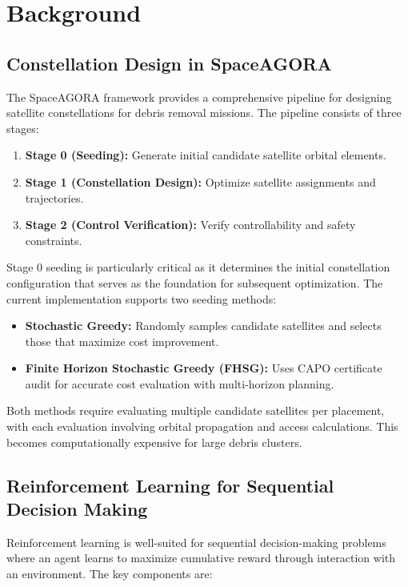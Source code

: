 \section{Background}
\label{sec:background}

\subsection{Constellation Design in SpaceAGORA}

The SpaceAGORA framework provides a comprehensive pipeline for designing satellite constellations for debris removal missions. The pipeline consists of three stages:

\begin{enumerate}
    \item \textbf{Stage 0 (Seeding):} Generate initial candidate satellite orbital elements.
    \item \textbf{Stage 1 (Constellation Design):} Optimize satellite assignments and trajectories.
    \item \textbf{Stage 2 (Control Verification):} Verify controllability and safety constraints.
\end{enumerate}

Stage 0 seeding is particularly critical as it determines the initial constellation configuration that serves as the foundation for subsequent optimization. The current implementation supports two seeding methods:
\begin{itemize}
    \item \textbf{Stochastic Greedy:} Randomly samples candidate satellites and selects those that maximize cost improvement.
    \item \textbf{Finite Horizon Stochastic Greedy (FHSG):} Uses CAPO certificate audit for accurate cost evaluation with multi-horizon planning.
\end{itemize}

Both methods require evaluating multiple candidate satellites per placement, with each evaluation involving orbital propagation and access calculations. This becomes computationally expensive for large debris clusters.

\subsection{Reinforcement Learning for Sequential Decision Making}

Reinforcement learning is well-suited for sequential decision-making problems where an agent learns to maximize cumulative reward through interaction with an environment. The key components are:

